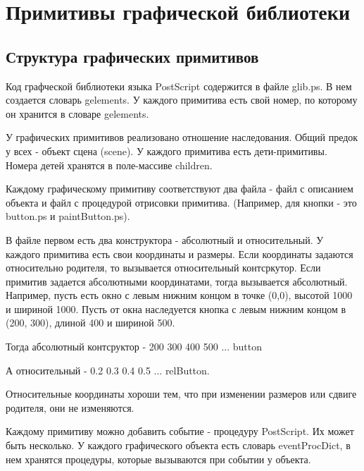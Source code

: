 \documentclass[14pt]{extarticle}
\begin{document}
	\pagebreak
	\section{Примитивы графической библиотеки}
	\subsection*{Структура графических примитивов}
		Код графческой библиотеки языка PostScript содержится в файле  glib.ps. В нем создается словарь gelements. У каждого примитива есть свой номер, по которому он хранится в словаре gelements. 
		
		У графических примитивов реализовано отношение наследования. Общий предок у всех - объект сцена (scene). У каждого примитива есть дети-примитивы. Номера детей хранятся в поле-массиве children.
		
		Каждому графическому примитиву соответствуют два файла - файл с описанием объекта и файл с процедурой отрисовки примитива. (Например, для кнопки - это button.ps и paintButton.ps). 
		
		В файле первом есть два конструктора - абсолютный и относительный. У каждого примитива есть свои координаты и размеры. Если координаты задаются относительно родителя, то вызывается относительный контсркутор. Если примитив задается абсолютными координатами, тогда вызывается абсолютный. Например, пусть есть окно с левым нижним концом в точке (0,0), высотой 1000 и шириной 1000. Пусть от окна наследуется кнопка с левым нижним концом в (200, 300), длиной 400 и шириной 500. 
		
		Тогда абсолютный контсруктор -
		200 300 400 500 ... button
		
А относительный - 
		0.2 0.3 0.4 0.5	... relButton.
		
		
Относительные координаты хороши тем, что при изменении размеров или сдвиге родителя, они не изменяются.

Каждому примитиву можно добавить событие - процедуру PostScript. Их может быть несколько. У каждого графического объекта есть словарь eventProcDict, в нем хранятся процедуры, которые вызываются при событии у объекта. 
	
\end{document}
